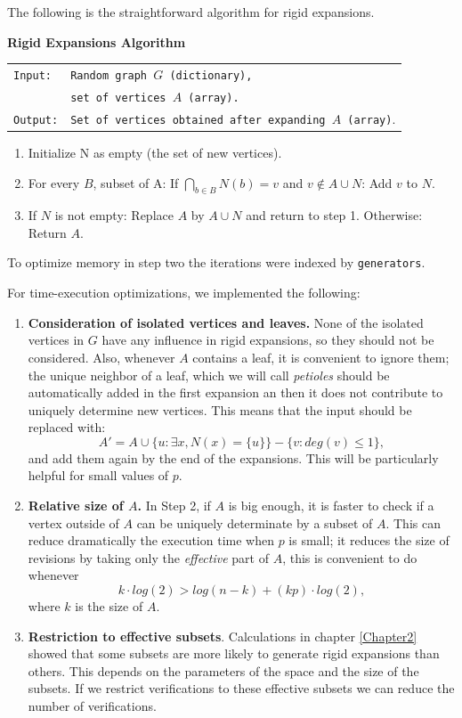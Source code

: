 The following is the straightforward algorithm for rigid expansions.

\begin{cajita}
\textbf{Rigid Expansions Algorithm} \hfill \break

\begin{tabular}{ l l }
\texttt{Input:} &  \texttt{Random graph $G$ (dictionary),} \\
                &  \texttt{set of vertices $A$ (array).}\\
\texttt{Output:} & \texttt{Set of vertices obtained after expanding $A$ (array)}.\\
\end{tabular}
\begin{enumerate}
\item Initialize N as empty (the set of new vertices).
\item For every $B$, subset of A:\hfill \break
\hphantom{12} If $\bigcap\limits_{b\in B} N(b) = v$ and $v\not\in A\cup N$: \hfill \break
\hphantom{1234} Add $v$ to $N$.
\item If $N$ is not empty: \hfill \break
\hphantom{12} Replace $A$ by $A\cup N$ and return to step 1. \hfill \break
      Otherwise:\hfill \break
\hphantom{12} Return $A$.
\end{enumerate}
\end{cajita}

To optimize memory in step two the iterations were indexed by \texttt{generators}.

For time-execution optimizations, we implemented the following:

\begin{enumerate}
\item \textbf{Consideration of isolated vertices and leaves.} None of the isolated vertices in $G$ have any influence in rigid expansions, so they should not be considered. Also, whenever $A$ contains a leaf, it is convenient to ignore them; the unique neighbor of a leaf, which we will call \textit{petioles} should be automatically added in the first expansion an then it does not contribute to uniquely determine new vertices. This means that the input should be replaced with:
$$A' = A \cup \{u: \exists x, N(x)=\{u\}\} - \{v: deg(v)\leq 1 \},$$
and add them again by the end of the expansions. This will be particularly helpful for small values of $p$.
\item \textbf{Relative size of $A$.} In Step 2, if $A$ is big enough, it is faster to check if a vertex outside of $A$ can be uniquely determinate by a subset of $A$. This can reduce dramatically the execution time when $p$ is small; it reduces the size of revisions by taking only the \textit{effective} part of $A$, this is convenient to do whenever
$$k\cdot log(2) > log(n-k) + (kp)\cdot log(2),$$
where $k$ is the size of $A$.

\item \textbf{Restriction to effective subsets}. Calculations in chapter \ref{Chapter2} showed that some subsets are more likely to generate rigid expansions than others. This depends on the parameters of the space and the size of the subsets. If we restrict verifications to these effective subsets we can reduce the number of verifications.
\end{enumerate}

